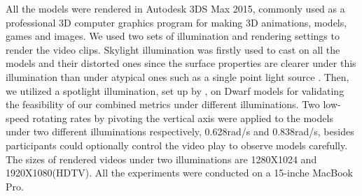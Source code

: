 All the models were rendered in Autodesk 3DS Max 2015, commonly used as a professional  3D computer graphics program for making 3D animations, models, games and images. We used two sets of illumination and rendering settings to render the video clips.   Skylight illumination was firstly used to cast on all the models and their distorted ones since the surface properties are clearer under this illumination than under atypical ones such as a single point light source \cite{Fleming_2003}. Then, we utilized a spotlight illumination, set up by , on Dwarf models for validating the feasibility of our combined metrics under different illuminations.  Two low-speed rotating rates by pivoting the vertical axis were applied to the models under two different illuminations respectively, 0.628rad/s and 0.838rad/s, besides participants could optionally control the video play to observe models carefully. The sizes of rendered videos under two illuminations are 1280X1024 and 1920X1080(HDTV). All the experiments were conducted on a 15-inche MacBook Pro.\\
